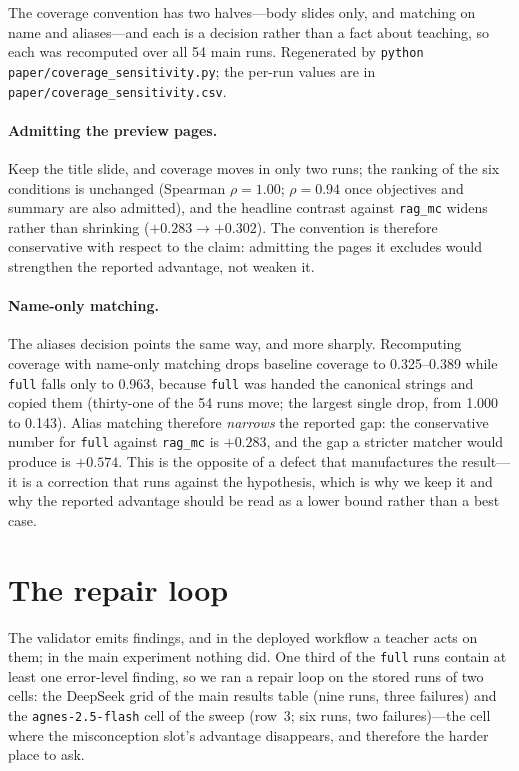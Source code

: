 \documentclass[11pt,a4paper]{article}
\newcommand{\id}[1]{\texttt{#1}}
\begin{document}
The coverage convention has two halves---body slides only, and matching on name
and aliases---and each is a decision rather than a fact about teaching, so each
was recomputed over all 54 main runs. Regenerated by
\id{python paper/coverage\_sensitivity.py}; the per-run values are in
\id{paper/coverage\_sensitivity.csv}.

\paragraph{Admitting the preview pages.} Keep the title slide, and coverage
moves in only two runs; the ranking of the six conditions is unchanged (Spearman
$\rho=1.00$; $\rho=0.94$ once objectives and summary are also admitted), and the
headline contrast against \id{rag\_mc} widens rather than shrinking
($+0.283\to+0.302$). The convention is therefore conservative with respect to the
claim: admitting the pages it excludes would strengthen the reported advantage,
not weaken it.

\paragraph{Name-only matching.} The aliases decision points the same way, and
more sharply. Recomputing coverage with name-only matching drops baseline
coverage to 0.325--0.389 while \id{full} falls only to 0.963, because \id{full}
was handed the canonical strings and copied them (thirty-one of the 54 runs move;
the largest single drop, from 1.000 to 0.143). Alias matching therefore
\emph{narrows} the reported gap: the conservative number for \id{full} against
\id{rag\_mc} is $+0.283$, and the gap a stricter matcher would produce is
$+0.574$. This is the opposite of a defect that manufactures the
result---it is a correction that runs against the hypothesis, which is why we
keep it and why the reported advantage should be read as a lower bound rather
than a best case.

\section{The repair loop}
\label{sec:s-repair}

The validator emits findings, and in the deployed workflow a teacher acts on
them; in the main experiment nothing did. One third of the \id{full} runs
contain at least one error-level finding, so we ran a repair loop on the stored
runs of two cells: the DeepSeek grid of the main results table (nine runs, three
failures) and the \id{agnes-2.5-flash} cell of the sweep (row~3; six runs, two
failures)---the cell where the misconception slot's advantage disappears, and
therefore the harder place to ask.
\end{document}
